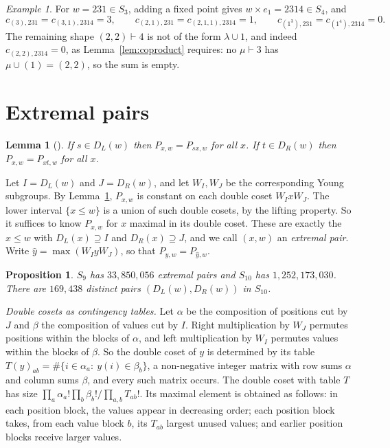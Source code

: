 \documentclass[11pt]{amsart}
\newtheorem{proposition}[theorem]{Proposition}
\newtheorem{lemma}[theorem]{Lemma}
\theoremstyle{definition}
\theoremstyle{remark}
\newtheorem{exa}{Example}[section]
\begin{document}
\begin{exa}\label{exa:stability}
For $w=231\in S_3$, adding a fixed point gives $w\times e_1=2314\in S_4$, and
\[
c_{(3),231}=c_{(3,1),2314}=3,\qquad c_{(2,1),231}=c_{(2,1,1),2314}=1,\qquad c_{(1^3),231}=c_{(1^4),2314}=0 .
\]
The remaining shape $(2,2)\vdash4$ is not of the form $\lambda\cup1$, and indeed $c_{(2,2),2314}=0$, as Lemma~\ref{lem:coproduct} requires: no $\mu\vdash3$ has $\mu\cup(1)=(2,2)$, so the sum is empty.
\end{exa}

\section{Extremal pairs}\label{sec:extremal}

\begin{lemma}[{\cite[(2.3.g)]{KL}}]\label{lem:descent}
If $s\in D_L(w)$ then $P_{x,w}=P_{sx,w}$ for all $x$. If $t\in D_R(w)$ then $P_{x,w}=P_{xt,w}$ for all $x$.
\end{lemma}

Let $I=D_L(w)$ and $J=D_R(w)$, and let $W_I,W_J$ be the corresponding Young subgroups. By Lemma~\ref{lem:descent}, $P_{x,w}$ is constant on each double coset $W_IxW_J$. The lower interval $\{x\le w\}$ is a union of such double cosets, by the lifting property. So it suffices to know $P_{x,w}$ for $x$ maximal in its double coset. These are exactly the $x\le w$ with $D_L(x)\supseteq I$ and $D_R(x)\supseteq J$, and we call $(x,w)$ an \emph{extremal pair}. Write $\hat y=\max(W_IyW_J)$, so that $P_{y,w}=P_{\hat y,w}$.

\begin{proposition}\label{prop:counts}
$S_9$ has $33{,}850{,}056$ extremal pairs and $S_{10}$ has $1{,}252{,}173{,}030$. There are $169{,}438$ distinct pairs $(D_L(w),D_R(w))$ in $S_{10}$.
\end{proposition}

\emph{Double cosets as contingency tables.} Let $\alpha$ be the composition of positions cut by $J$ and $\beta$ the composition of values cut by $I$. Right multiplication by $W_J$ permutes positions within the blocks of $\alpha$, and left multiplication by $W_I$ permutes values within the blocks of $\beta$. So the double coset of $y$ is determined by its table $T(y)_{ab}=\#\{i\in\alpha_a:\ y(i)\in\beta_b\}$, a non-negative integer matrix with row sums $\alpha$ and column sums $\beta$, and every such matrix occurs. The double coset with table $T$ has size $\prod_a\alpha_a!\prod_b\beta_b!/\prod_{a,b}T_{ab}!$. Its maximal element is obtained as follows: in each position block, the values appear in decreasing order; each position block takes, from each value block $b$, its $T_{ab}$ largest unused values; and earlier position blocks receive larger values.
\end{document}
